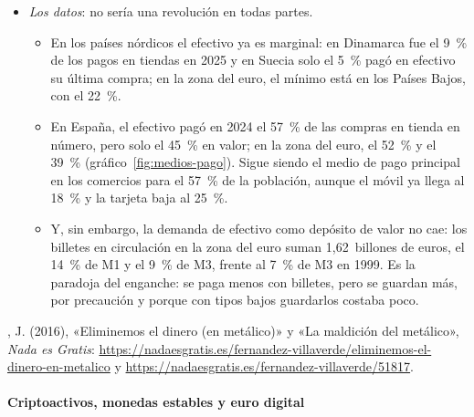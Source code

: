 \documentclass[11pt]{article}
\begin{document}
\begin{itemize}
\item \emph{Los datos}: no sería una revolución en todas partes.
  \begin{itemize}
  \item En los países nórdicos el efectivo ya es marginal: en Dinamarca fue el 9~\% de los pagos en tiendas en 2025\nocite{DNB2026Kontanter} y en Suecia solo el 5~\% pagó en efectivo su última compra\nocite{Riksbank2026Payments}; en la zona del euro, el mínimo está en los Países Bajos, con el 22~\%\nocite{BCE2024SPACE}.
  \item En España, el efectivo pagó en 2024 el 57~\% de las compras en tienda en número, pero solo el 45~\% en valor; en la zona del euro, el 52~\% y el 39~\%\nocite{BCE2024SPACE} (gráfico~\ref{fig:medios-pago}). Sigue siendo el medio de pago principal en los comercios para el 57~\% de la población, aunque el móvil ya llega al 18~\% y la tarjeta baja al 25~\%\nocite{BdE2026HabitosNota}.
  \item Y, sin embargo, la demanda de efectivo como depósito de valor no cae: los billetes en circulación en la zona del euro suman 1,62~billones de euros, el 14~\% de M1 y el 9~\% de M3, frente al 7~\% de M3 en 1999\nocite{BCE2026BSI}. Es la paradoja del enganche: se paga menos con billetes, pero se guardan más, por precaución y porque con tipos bajos guardarlos costaba poco.
  \end{itemize}
\end{itemize}

\begin{anotaciones}
, J. (2016), «Eliminemos el dinero (en metálico)» y «La maldición del metálico», \emph{Nada es Gratis}: \url{https://nadaesgratis.es/fernandez-villaverde/eliminemos-el-dinero-en-metalico} y \url{https://nadaesgratis.es/fernandez-villaverde/51817}.
\end{anotaciones}

\paragraph{Criptoactivos, monedas estables y euro digital}
\end{document}
